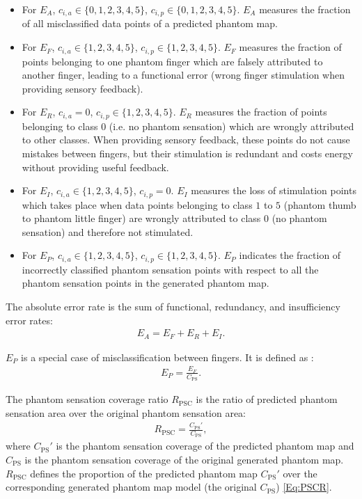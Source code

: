 \begin{itemize}
  \item For $E_A$,  $c_{i,a} \in \{0, 1, 2, 3, 4, 5 \}$, $c_{i,p} \in \{0, 1, 2, 3, 4, 5 \}$. $E_A$ measures the fraction of all misclassified data points of a predicted phantom map.
  \item For $E_F$, $c_{i,a} \in \{1, 2, 3, 4, 5 \}$, $c_{i,p} \in \{1, 2, 3, 4, 5 \}$. $E_F$ measures the fraction of points belonging to one phantom finger which are falsely attributed to another finger, leading to a functional error (wrong finger stimulation when providing sensory feedback).
  \item For $E_R$, $ c_{i,a} = 0 $, $c_{i,p} \in \{1, 2, 3, 4, 5 \} $. $E_R$ measures the fraction of points  belonging to class $0$ (i.e. no phantom sensation) which are wrongly attributed to other classes. When providing sensory feedback, these points do not cause mistakes between fingers, but their stimulation is redundant and costs energy without providing useful feedback. 
  \item For $E_I$, $c_{i,a} \in \{1, 2, 3, 4, 5 \}$, $c_{i,p} = 0 $. $E_I$ measures the loss of stimulation points which takes place when data points belonging to class $1$ to $5$ (phantom thumb to phantom little finger) are wrongly attributed to class $0$ (no phantom sensation) and therefore not stimulated.
  \item For $E_P$, $c_{i,a} \in \{1, 2, 3, 4, 5 \}$, $c_{i,p} \in \{1, 2, 3, 4, 5 \}$. $E_P$ indicates the fraction of incorrectly classified phantom sensation points with respect to all the phantom sensation points in the generated phantom map.
\end{itemize}


The absolute error rate is the sum of functional, redundancy, and insufficiency error rates:
\begin{gather}
\label{Eq:FourAccuracyMetrics}
E_A = E_F + E_R + E_I.
\end{gather}

$E_P$ is a special case of misclassification between fingers. It is defined as :
\begin{gather}
\label{Eq:FourAccuracyMetrics}
E_P =\frac{ E_F } { C_{\text{PS}}}.
\end{gather}

The phantom sensation coverage ratio $R_{\text{PSC}}$  is the ratio of predicted phantom sensation area over the original phantom sensation area:
\begin{gather}
\label{Eq:PSCR}
R_{\text{PSC}} = \frac{C_{\text{PS}}'}{C_{\text{PS}} },
\end{gather}
where $C_{\text{PS}}'$ is the phantom sensation coverage of the predicted phantom map and $C_{\text{PS}}$ is the phantom sensation coverage of the original generated phantom map.
$R_{\text{PSC}}$ defines the proportion of the predicted phantom map $C_{\text{PS}}'$ over the corresponding generated phantom map model (the original $C_{\text{PS}}$) \eqref{Eq:PSCR}.


